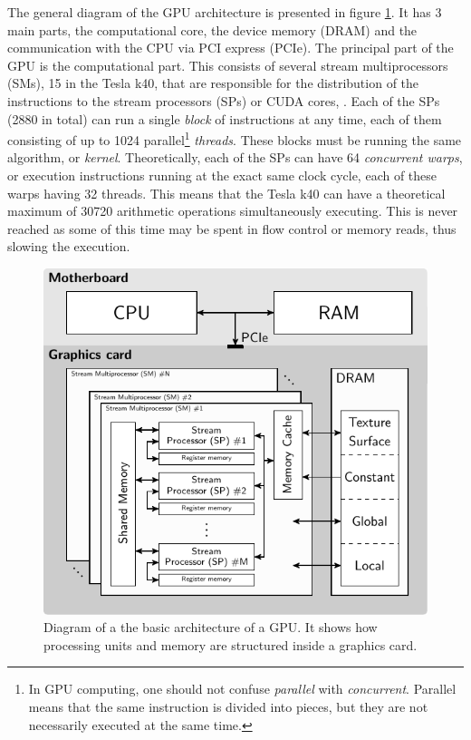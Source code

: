 The general diagram of the GPU architecture is presented in figure \ref{fig:GPUarch}. It has 3 main parts, the computational core, the device memory (DRAM) and the communication with the CPU via PCI express (PCIe).
The principal part of the GPU is the computational part. This consists of several stream multiprocessors (SMs), 15 in the Tesla k40, that are responsible for the distribution of the instructions to the stream processors (SPs) or CUDA cores, . Each of the SPs (2880 in total) can run a single \textit{block} of instructions at any time, each of them consisting of up to 1024 parallel\footnote{In GPU computing, one should not confuse \textit{parallel} with \textit{concurrent}. Parallel means that the same instruction is divided into pieces, but they are not necessarily executed at the same time.} \textit{threads}. These blocks must be running the same algorithm, or \textit{kernel}. Theoretically, each of the SPs can have 64 \textit{concurrent warps}, or execution instructions running at the exact same clock cycle, each of these warps having 32 threads. This means that the Tesla k40 can have a theoretical maximum of 30720 arithmetic operations simultaneously executing. This is never reached as some of this time may be spent in flow control or memory reads, thus slowing the execution. 

\begin{figure}
\begin{center}

\includegraphics[width=\textwidth]{GPUmethods/architecture-figure0.pdf} 
\end{center}

\caption[Block diagram of a GPU architecture]{\label{fig:GPUarch} Diagram of a the basic architecture of a GPU. It shows how processing units and memory are structured inside a graphics card.} 
\end{figure}

